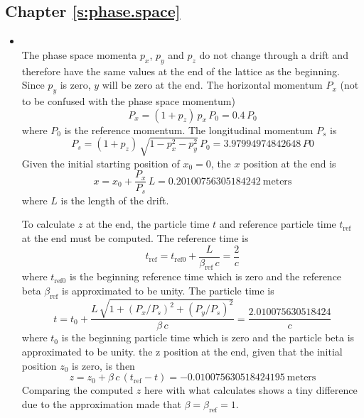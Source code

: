 \documentclass{hitec}     %
\begin{document}
{{{{%
\subsection{Chapter \ref{s:phase.space}}   %

\begin{itemize}[leftmargin=*]
%
\item[]\hspace*{-24pt} \\
The phase space momenta $p_x$, $p_y$ and $p_z$ do not change through a drift and therefore have the same values at the 
end of the lattice as the beginning. Since $p_y$ is zero, $y$ will be zero at the end. The horizontal momentum $P_x$ (not to be confused with the phase space momentum)
\begin{equation}
    P_x = (1 + p_z) \, p_x \, P_0 = 0.4 \, P_0
\end{equation}
where $P_0$ is the reference momentum. The longitudinal momentum $P_s$ is
\begin{equation}
    P_s = (1 + p_z) \, \sqrt{1 - p_x^2 - p_y^2} \, P_0 = 3.97994974842648 \, P0
\end{equation}
Given the initial starting position of $x_0 = 0$,  the $x$ position at the end is
\begin{equation}
    x = x_0 + \frac{P_x}{P_s} \, L = 0.20100756305184242~\text{meters}
\end{equation}
where $L$ is the length of the drift.

To calculate $z$ at the end, the particle time $t$ and reference particle time $t_\text{ref}$ at the end must be computed.
The reference time is
\begin{equation}
  t_\text{ref} = t_\text{ref0} + \frac{L}{\beta_\text{ref} \, c} = \frac{2}{c}
\end{equation}
where $t_\text{ref0}$ is the beginning reference time which is zero and
the reference beta $\beta_\text{ref}$ is approximated to be unity.
The particle time is
\begin{equation}
    t = t_0 + \frac{L \, \sqrt{1 + (P_x/P_s)^2 + (P_y/P_s)^2}}{\beta \, c} = \frac{2.010075630518424}{c}
\end{equation}
where $t_0$ is the beginning particle time which is zero and the particle beta is approximated to be unity.
the z position at the end, given that the initial position $z_0$ is zero, is then
\begin{equation}
    z = z_0 + \beta \, c \, (t_\text{ref} - t) = -0.010075630518424195~\text{meters}
\end{equation}
Comparing the computed $z$ here with what \bmad calculates shows a tiny difference due to the approximation made that
$\beta = \beta_\text{ref} = 1$.
\end{itemize}

}}}}
\end{document}
